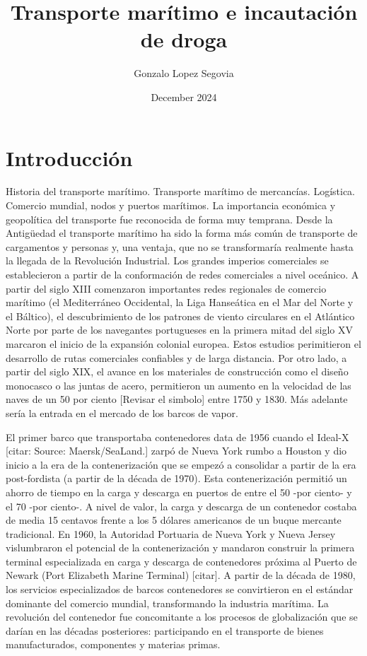 \documentclass{article}
\title{Transporte marítimo e incautación de droga}
\author{Gonzalo Lopez Segovia}
\date{December 2024}
\begin{document}
\maketitle

\section{Introducción}
Historia del transporte marítimo. Transporte marítimo de mercancías. Logística.
Comercio mundial, nodos y puertos marítimos.
La importancia económica y geopolítica del transporte fue reconocida de forma muy temprana. Desde la Antigüedad el transporte marítimo ha sido la forma más común de transporte de cargamentos y personas y, una ventaja, que no se transformaría realmente hasta la llegada de la Revolución Industrial. Los grandes imperios comerciales se establecieron a partir de la conformación de redes comerciales a nivel oceánico. A partir del siglo XIII comenzaron importantes redes regionales de comercio marítimo (el Mediterráneo Occidental, la Liga Hanseática en el Mar del Norte y el Báltico), el descubrimiento de los patrones de viento circulares en el Atlántico Norte por parte de los navegantes portugueses en la primera mitad del siglo XV marcaron el inicio de la expansión colonial europea. Estos estudios perimitieron el desarrollo de rutas comerciales confiables y de larga distancia. Por otro lado, a partir del siglo XIX, el avance en los materiales de construcción como el diseño monocasco o las juntas de acero, permitieron un aumento en la velocidad de las naves de un 50 por ciento [Revisar el simbolo] entre 1750 y 1830. Más adelante sería la entrada en el mercado de los barcos de vapor.

El primer barco que transportaba contenedores data de 1956 cuando el Ideal-X [citar: Source: Maersk/SeaLand.] zarpó de Nueva York rumbo a Houston y dio inicio a la era de la contenerización que se empezó a consolidar a partir de la era post-fordista (a partir de la década de 1970). Esta contenerización permitió un ahorro de tiempo en la carga y descarga en puertos de entre el 50 -por ciento- y el 70 -por ciento-. A nivel de valor, la carga y descarga de un contenedor costaba de media 15 centavos frente a los 5 dólares americanos de un buque mercante tradicional. En 1960, la Autoridad Portuaria de Nueva York y Nueva Jersey vislumbraron el potencial de la contenerización y mandaron construir la primera terminal especializada en carga y descarga de contenedores próxima al Puerto de Newark (Port Elizabeth Marine Terminal) [citar]. A partir de la década de 1980, los servicios especializados de barcos contenedores se convirtieron en el estándar dominante del comercio mundial, transformando la industria marítima. La revolución del contenedor fue concomitante a los procesos de globalización que se darían en las décadas posteriores: participando en el transporte de bienes manufacturados, componentes y materias primas.
\end{document}
